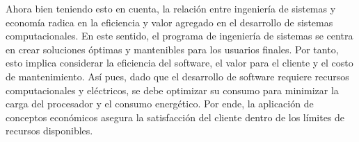 
\normalsize Ahora bien teniendo esto en cuenta, la relación entre ingeniería de sistemas y economía radica en la eficiencia y valor agregado en el desarrollo de sistemas computacionales. En este sentido, el programa de ingeniería de sistemas se centra en crear soluciones óptimas y mantenibles para los usuarios finales. Por tanto, esto implica considerar la eficiencia del software, el valor para el cliente y el costo de mantenimiento. Así pues, dado que el desarrollo de software requiere recursos computacionales y eléctricos, se debe optimizar su consumo para minimizar la carga del procesador y el consumo energético. Por ende, la aplicación de conceptos económicos asegura la satisfacción del cliente dentro de los límites de recursos disponibles.
